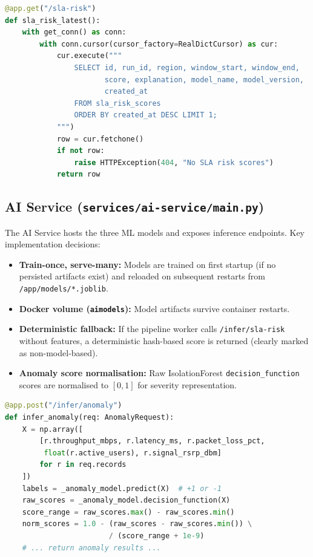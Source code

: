 \begin{lstlisting}[language=Python, caption={API Gateway --- SLA risk endpoint (excerpt).}]
@app.get("/sla-risk")
def sla_risk_latest():
    with get_conn() as conn:
        with conn.cursor(cursor_factory=RealDictCursor) as cur:
            cur.execute("""
                SELECT id, run_id, region, window_start, window_end,
                       score, explanation, model_name, model_version,
                       created_at
                FROM sla_risk_scores
                ORDER BY created_at DESC LIMIT 1;
            """)
            row = cur.fetchone()
            if not row:
                raise HTTPException(404, "No SLA risk scores")
            return row
\end{lstlisting}

\subsection{AI Service (\texttt{services/ai-service/main.py})}

The AI Service hosts the three ML models and exposes inference endpoints. Key implementation decisions:

\begin{itemize}
  \item \textbf{Train-once, serve-many:} Models are trained on first startup (if no persisted artifacts exist) and reloaded on subsequent restarts from \texttt{/app/models/*.joblib}.
  \item \textbf{Docker volume (\texttt{aimodels}):} Model artifacts survive container restarts.
  \item \textbf{Deterministic fallback:} If the pipeline worker calls \texttt{/infer/sla-risk} without features, a deterministic hash-based score is returned (clearly marked as non-model-based).
  \item \textbf{Anomaly score normalisation:} Raw IsolationForest \texttt{decision\_function} scores are normalised to $[0, 1]$ for severity representation.
\end{itemize}

\begin{lstlisting}[language=Python, caption={AI Service --- IsolationForest inference (excerpt).}]
@app.post("/infer/anomaly")
def infer_anomaly(req: AnomalyRequest):
    X = np.array([
        [r.throughput_mbps, r.latency_ms, r.packet_loss_pct,
         float(r.active_users), r.signal_rsrp_dbm]
        for r in req.records
    ])
    labels = _anomaly_model.predict(X)  # +1 or -1
    raw_scores = _anomaly_model.decision_function(X)
    score_range = raw_scores.max() - raw_scores.min()
    norm_scores = 1.0 - (raw_scores - raw_scores.min()) \
                        / (score_range + 1e-9)
    # ... return anomaly results ...
\end{lstlisting}

